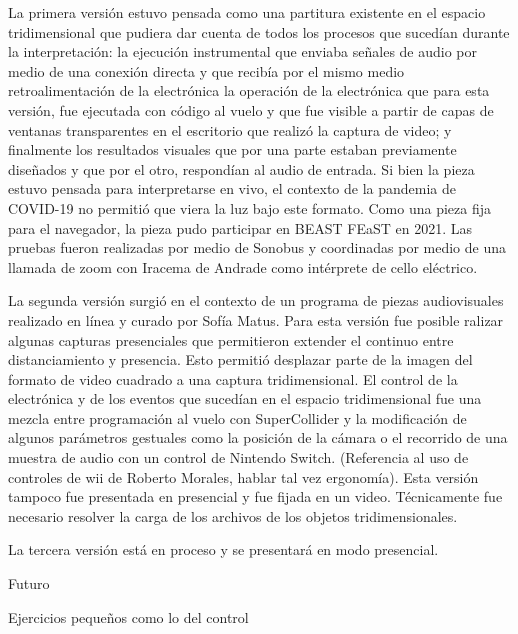 \documentclass[11pt,letterpaper, twocolumn, twoside, openright,
headinclude,footinclude,BCOR5mm,
numbers=noenddot,cleardoublepage=empty,
tablecaptionabove]{article}
\begin{document}
La primera versión estuvo pensada como una partitura existente en el espacio tridimensional que pudiera dar cuenta de todos los procesos que sucedían durante la interpretación: la ejecución instrumental que enviaba señales de audio por medio de una conexión directa y que recibía por el mismo medio retroalimentación de la electrónica la operación de la electrónica que para esta versión, fue ejecutada con código al vuelo y que fue visible a partir de capas de ventanas transparentes en el escritorio que realizó la captura de video; y finalmente los resultados visuales que por una parte estaban previamente diseñados y que por el otro, respondían al audio de entrada. Si bien la pieza estuvo pensada para interpretarse en vivo, el contexto de la pandemia de COVID-19 no permitió que viera la luz bajo este formato. Como una pieza fija para el navegador, la pieza pudo participar en BEAST FEaST en 2021. Las pruebas fueron realizadas por medio de Sonobus y coordinadas por medio de una llamada de zoom con Iracema de Andrade como intérprete de cello eléctrico. 



La segunda versión surgió en el contexto de un programa de piezas audiovisuales realizado en línea y curado por Sofía Matus. Para esta versión fue posible ralizar algunas capturas presenciales que permitieron extender el continuo entre distanciamiento y presencia. Esto permitió desplazar parte de la imagen del formato de video cuadrado a una captura tridimensional. El control de la electrónica y de los eventos que sucedían en el espacio tridimensional fue una mezcla entre programación al vuelo con SuperCollider y la modificación de algunos parámetros gestuales como la posición de la cámara o el recorrido de una muestra de audio con un control de Nintendo Switch. (Referencia al uso de controles de wii de Roberto Morales, hablar tal vez ergonomía). Esta versión tampoco fue presentada en presencial y fue fijada en un video. Técnicamente fue necesario resolver la carga de los archivos de los objetos tridimensionales.  


La tercera versión está en proceso y se presentará en modo presencial.  

Futuro 

Ejercicios pequeños como lo del control
\end{document}
